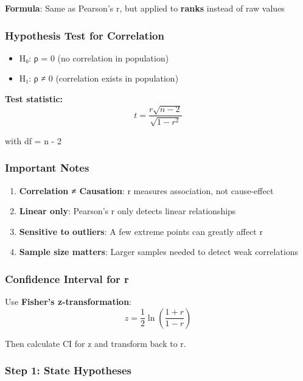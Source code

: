 \documentclass[11pt]{article}
\providecommand{\tightlist}{%
      \setlength{\itemsep}{0pt}\setlength{\parskip}{0pt}}
\begin{document}
\textbf{Formula}: Same as Pearson's r, but applied to \textbf{ranks}
instead of raw values

\subsubsection{Hypothesis Test for
Correlation}\label{hypothesis-test-for-correlation}

\begin{itemize}
\tightlist
\item
  H₀: ρ = 0 (no correlation in population)
\item
  H₁: ρ ≠ 0 (correlation exists in population)
\end{itemize}

\textbf{Test statistic:} \[t = \frac{r\sqrt{n-2}}{\sqrt{1-r^2}}\]

with df = n - 2

\subsubsection{Important Notes}\label{important-notes}

\begin{enumerate}
\def\labelenumi{\arabic{enumi}.}
\tightlist
\item
  \textbf{Correlation ≠ Causation}: r measures association, not
  cause-effect
\item
  \textbf{Linear only}: Pearson's r only detects linear relationships
\item
  \textbf{Sensitive to outliers}: A few extreme points can greatly
  affect r
\item
  \textbf{Sample size matters}: Larger samples needed to detect weak
  correlations
\end{enumerate}

\subsubsection{Confidence Interval for
r}\label{confidence-interval-for-r}

Use \textbf{Fisher's z-transformation}:
\[z = \frac{1}{2}\ln\left(\frac{1+r}{1-r}\right)\]

Then calculate CI for z and transform back to r.

    \subsubsection{Step 1: State Hypotheses}\label{step-1-state-hypotheses}
\end{document}
